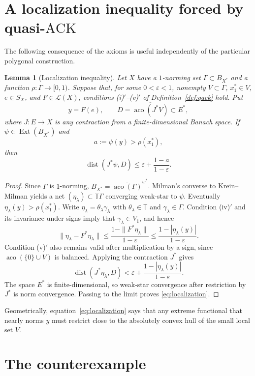 \documentclass[11pt]{article}
\newtheorem{lemma}[theorem]{Lemma}
\theoremstyle{definition}
\newcommand{\T}{\mathbb T}
\newcommand{\Ext}{\operatorname{Ext}}
\newcommand{\aco}{\operatorname{aco}}
\newcommand{\dist}{\operatorname{dist}}
\newcommand{\Lin}{\mathcal L}
\newcommand{\eps}{\varepsilon}
\newcommand{\ACK}{\mathrm{ACK}}
\begin{document}
\section{A localization inequality forced by quasi-$\ACK$}

The following consequence of the axioms is useful independently of the
particular polygonal construction.

\begin{lemma}[Localization inequality]\label{lem:localization}
Let $X$ have a $1$-norming set $\Gamma\subset B_{X^*}$ and a function
$\rho:\Gamma\to[0,1)$.  Suppose that, for some $0<\eps<1$, nonempty
$V\subset\Gamma$, $x_1^*\in V$, $e\in S_X$, and $F\in\Lin(X)$, conditions
\textup{(i)$'$}--\textup{(v)$'$} of Definition~\ref{def:qack} hold.  Put
\[
 y=F(e),\qquad
 D=\overline{\aco(J^*V)}\subset E^*,
\]
where $J:E\to X$ is any contraction from a finite-dimensional Banach space.
If $\psi\in\Ext(B_{X^*})$ and
\[
  a:=\psi(y)>\rho(x_1^*),
\]
then
\begin{equation}\label{eq:localization}
  \dist(J^*\psi,D)
  \le \eps+\frac{1-a}{1-\eps}.
\end{equation}
\end{lemma}

\begin{proof}
Since $\Gamma$ is $1$-norming,
$B_{X^*}=\overline{\aco(\Gamma)}^{w^*}$.  Milman's converse to
Krein--Milman yields a net $(\eta_\lambda)\subset\T\Gamma$ converging
weak-star to $\psi$.  Eventually
$\eta_\lambda(y)>\rho(x_1^*)$.  Write
$\eta_\lambda=\theta_\lambda\gamma_\lambda$ with
$\theta_\lambda\in\T$ and $\gamma_\lambda\in\Gamma$.  Condition (iv)$'$
and its invariance under signs imply that $\gamma_\lambda\in V_1$, and hence
\[
 \|\eta_\lambda-F^*\eta_\lambda\|
 \le\frac{1-\|F^*\eta_\lambda\|}{1-\eps}
 \le\frac{1-|\eta_\lambda(y)|}{1-\eps}.
\]
Condition (v)$'$ also remains valid after multiplication by a sign, since
$\aco(\{0\}\cup V)$ is balanced.  Applying the contraction $J^*$ gives
\[
 \dist(J^*\eta_\lambda,D)
 <\eps+\frac{1-|\eta_\lambda(y)|}{1-\eps}.
\]
The space $E^*$ is finite-dimensional, so weak-star convergence after
restriction by $J^*$ is norm convergence.  Passing to the limit proves
\eqref{eq:localization}.
\end{proof}

Geometrically, equation~\eqref{eq:localization} says that any extreme functional that
nearly norms $y$ must restrict close to the absolutely convex hull of the
small local set $V$.

\section{The counterexample}
\end{document}
